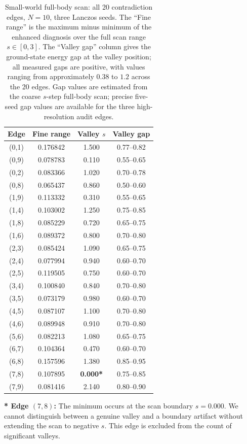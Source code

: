 \documentclass[pdflatex,sn-mathphys-num,iicol]{sn-jnl}
\begin{document}
\begin{table}[h]
\centering
\caption{Small-world full-body scan: all 20 contradiction edges, $N=10$, three Lanczos seeds. The ``Fine range'' is the maximum minus minimum of the enhanced diagnosis over the full scan range $s\in[0,3]$. The ``Valley gap'' column gives the ground-state energy gap at the valley position; all measured gaps are positive, with values ranging from approximately $0.38$ to $1.2$ across the 20 edges. Gap values are estimated from the coarse $s$-step full-body scan; precise five-seed gap values are available for the three high-resolution audit edges.}
\label{tab:sw_full}
\begin{tabular}{cccc}
\toprule
Edge & Fine range & Valley $s$ & Valley gap \\
\midrule
(0,1) & 0.176842 & 1.500 & 0.77--0.82 \\
(0,9) & 0.078783 & 0.110 & 0.55--0.65 \\
(0,2) & 0.083366 & 1.020 & 0.70--0.78 \\
(0,8) & 0.065437 & 0.860 & 0.50--0.60 \\
(1,9) & 0.113332 & 0.310 & 0.55--0.65 \\
(1,4) & 0.103002 & 1.250 & 0.75--0.85 \\
(1,8) & 0.085229 & 0.720 & 0.65--0.75 \\
(1,6) & 0.089372 & 0.800 & 0.70--0.80 \\
(2,3) & 0.085424 & 1.090 & 0.65--0.75 \\
(2,4) & 0.077994 & 0.940 & 0.60--0.70 \\
(2,5) & 0.119505 & 0.750 & 0.60--0.70 \\
(3,4) & 0.100840 & 0.840 & 0.70--0.80 \\
(3,5) & 0.073179 & 0.980 & 0.60--0.70 \\
(4,5) & 0.087107 & 1.100 & 0.70--0.80 \\
(4,6) & 0.089948 & 0.910 & 0.70--0.80 \\
(5,6) & 0.082213 & 1.080 & 0.65--0.75 \\
(6,7) & 0.104364 & 0.470 & 0.60--0.70 \\
(6,8) & 0.157596 & 1.380 & 0.85--0.95 \\
(7,8) & 0.107895 & \textbf{0.000*} & 0.75--0.85 \\
(7,9) & 0.081416 & 2.140 & 0.80--0.90 \\
\bottomrule
\end{tabular}
\end{table}

\textbf{* Edge $(7,8)$:} The minimum occurs at the scan boundary $s=0.000$. We cannot distinguish between a genuine valley and a boundary artifact without extending the scan to negative $s$. This edge is excluded from the count of significant valleys.
\end{document}
